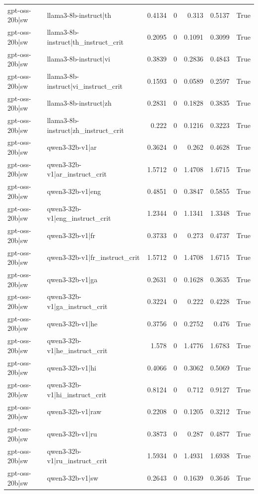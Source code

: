 \begin{table}
\begin{tabular}{l l r r r r l}
gpt-oss-20b|sw & llama3-8b-instruct|th & 0.4134 & 0 & 0.313 & 0.5137 & True \\
gpt-oss-20b|sw & llama3-8b-instruct|th_instruct_crit & 0.2095 & 0 & 0.1091 & 0.3099 & True \\
gpt-oss-20b|sw & llama3-8b-instruct|vi & 0.3839 & 0 & 0.2836 & 0.4843 & True \\
gpt-oss-20b|sw & llama3-8b-instruct|vi_instruct_crit & 0.1593 & 0 & 0.0589 & 0.2597 & True \\
gpt-oss-20b|sw & llama3-8b-instruct|zh & 0.2831 & 0 & 0.1828 & 0.3835 & True \\
gpt-oss-20b|sw & llama3-8b-instruct|zh_instruct_crit & 0.222 & 0 & 0.1216 & 0.3223 & True \\
gpt-oss-20b|sw & qwen3-32b-v1|ar & 0.3624 & 0 & 0.262 & 0.4628 & True \\
gpt-oss-20b|sw & qwen3-32b-v1|ar_instruct_crit & 1.5712 & 0 & 1.4708 & 1.6715 & True \\
gpt-oss-20b|sw & qwen3-32b-v1|eng & 0.4851 & 0 & 0.3847 & 0.5855 & True \\
gpt-oss-20b|sw & qwen3-32b-v1|eng_instruct_crit & 1.2344 & 0 & 1.1341 & 1.3348 & True \\
gpt-oss-20b|sw & qwen3-32b-v1|fr & 0.3733 & 0 & 0.273 & 0.4737 & True \\
gpt-oss-20b|sw & qwen3-32b-v1|fr_instruct_crit & 1.5712 & 0 & 1.4708 & 1.6715 & True \\
gpt-oss-20b|sw & qwen3-32b-v1|ga & 0.2631 & 0 & 0.1628 & 0.3635 & True \\
gpt-oss-20b|sw & qwen3-32b-v1|ga_instruct_crit & 0.3224 & 0 & 0.222 & 0.4228 & True \\
gpt-oss-20b|sw & qwen3-32b-v1|he & 0.3756 & 0 & 0.2752 & 0.476 & True \\
gpt-oss-20b|sw & qwen3-32b-v1|he_instruct_crit & 1.578 & 0 & 1.4776 & 1.6783 & True \\
gpt-oss-20b|sw & qwen3-32b-v1|hi & 0.4066 & 0 & 0.3062 & 0.5069 & True \\
gpt-oss-20b|sw & qwen3-32b-v1|hi_instruct_crit & 0.8124 & 0 & 0.712 & 0.9127 & True \\
gpt-oss-20b|sw & qwen3-32b-v1|raw & 0.2208 & 0 & 0.1205 & 0.3212 & True \\
gpt-oss-20b|sw & qwen3-32b-v1|ru & 0.3873 & 0 & 0.287 & 0.4877 & True \\
gpt-oss-20b|sw & qwen3-32b-v1|ru_instruct_crit & 1.5934 & 0 & 1.4931 & 1.6938 & True \\
gpt-oss-20b|sw & qwen3-32b-v1|sw & 0.2643 & 0 & 0.1639 & 0.3646 & True \\

\end{tabular}
\end{table}
